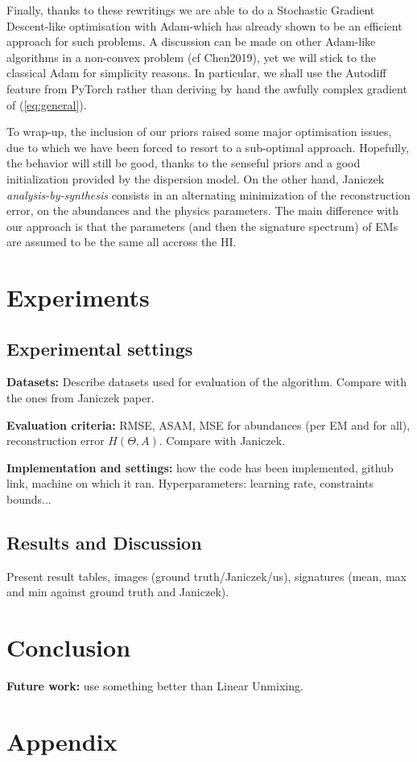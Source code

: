 \documentclass{article}
\begin{document}
Finally, thanks to these rewritings we are able to do a Stochastic Gradient Descent-like optimisation with Adam-which has already shown to be an efficient approach for such problems. A discussion can be made on other Adam-like algorithms in a non-convex problem (cf Chen2019), yet we will stick to the classical Adam for simplicity reasons. In particular, we shall use the Autodiff feature from PyTorch rather than deriving by hand the awfully complex gradient of (\ref{eq:general}).

To wrap-up, the inclusion of our priors raised some major optimisation issues, due to which we have been forced to resort to a sub-optimal approach. Hopefully, the behavior will still be good, thanks to the senseful priors and a good initialization provided by the dispersion model. On the other hand, Janiczek \emph{analysis-by-synthesis} consists in an alternating minimization of the reconstruction error, on the abundances and the physics parameters. The main difference with our approach is that the parameters (and then the signature spectrum) of EMs are assumed to be the same all accross the HI.

\section{Experiments}
\subsection{Experimental settings}
\textbf{Datasets:} Describe datasets used for evaluation of the algorithm. Compare with the ones from Janiczek paper.

\textbf{Evaluation criteria:} RMSE, ASAM, MSE for abundances (per EM and for all), reconstruction error $H(\Theta, A)$. Compare with Janiczek.

\textbf{Implementation and settings:} how the code has been implemented, github link, machine on which it ran. Hyperparameters: learning rate, constraints bounds...

\subsection{Results and Discussion}
Present result tables, images (ground truth/Janiczek/us), signatures (mean, max and min against ground truth and Janiczek).


\section{Conclusion}
\textbf{Future work:} use something better than Linear Unmixing.




% 



\section{Appendix}
\end{document}
